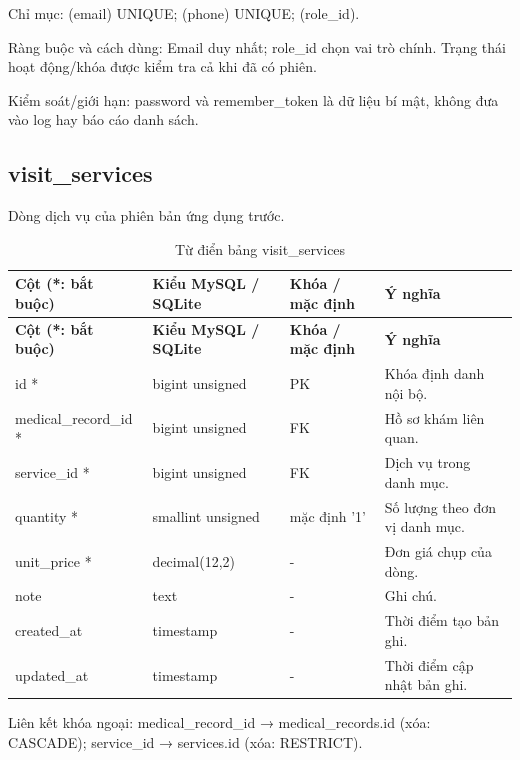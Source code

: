 Chỉ mục:\allowbreak{} (email) UNIQUE; (phone) UNIQUE; (role\_\allowbreak{}id).\allowbreak{}

Ràng buộc và cách dùng:\allowbreak{} Email duy nhất; role\_\allowbreak{}id chọn vai trò chính.\allowbreak{} Trạng thái hoạt động/\allowbreak{}khóa được kiểm tra cả khi đã có phiên.\allowbreak{}

Kiểm soát/\allowbreak{}giới hạn:\allowbreak{} password và remember\_\allowbreak{}token là dữ liệu bí mật, không đưa vào log hay báo cáo danh sách.\allowbreak{}

\clearpage

\subsection{visit\_\allowbreak{}services}
Dòng dịch vụ của phiên bản ứng dụng trước.\allowbreak{}


{\fontsize{10}{12}\selectfont\setlength{\tabcolsep}{3pt}\renewcommand{\arraystretch}{1.12}
\begin{longtable}{@{}L{\textwidth-4.86pt\relax} L{\textwidth-3.96pt\relax} L{\textwidth-2.88pt\relax} L{\textwidth-6.3pt\relax}@{}}
\caption{Từ điển bảng visit\_\allowbreak{}services}\\
\toprule
\textbf{Cột (*:\allowbreak{} bắt buộc)} & \textbf{Kiểu My\allowbreak{}SQL /\allowbreak{} SQLite} & \textbf{Khóa /\allowbreak{} mặc định} & \textbf{Ý nghĩa}\\\midrule
\endfirsthead
\toprule
\textbf{Cột (*:\allowbreak{} bắt buộc)} & \textbf{Kiểu My\allowbreak{}SQL /\allowbreak{} SQLite} & \textbf{Khóa /\allowbreak{} mặc định} & \textbf{Ý nghĩa}\\\midrule
\endhead
\bottomrule\endlastfoot
id * & bigint unsigned & PK & Khóa định danh nội bộ.\allowbreak{}\\[1pt]
medical\_\allowbreak{}record\_\allowbreak{}id * & bigint unsigned & FK & Hồ sơ khám liên quan.\allowbreak{}\\[1pt]
service\_\allowbreak{}id * & bigint unsigned & FK & Dịch vụ trong danh mục.\allowbreak{}\\[1pt]
quantity * & smallint unsigned & mặc định '1' & Số lượng theo đơn vị danh mục.\allowbreak{}\\[1pt]
unit\_\allowbreak{}price * & decimal(12,2) & - & Đơn giá chụp của dòng.\allowbreak{}\\[1pt]
note & text & - & Ghi chú.\allowbreak{}\\[1pt]
created\_\allowbreak{}at & timestamp & - & Thời điểm tạo bản ghi.\allowbreak{}\\[1pt]
updated\_\allowbreak{}at & timestamp & - & Thời điểm cập nhật bản ghi.\allowbreak{}\\[1pt]
\end{longtable}}
Liên kết khóa ngoại:\allowbreak{} medical\_\allowbreak{}record\_\allowbreak{}id → medical\_\allowbreak{}records.\allowbreak{}id (xóa:\allowbreak{} CASCADE); service\_\allowbreak{}id → services.\allowbreak{}id (xóa:\allowbreak{} RESTRICT).\allowbreak{}


